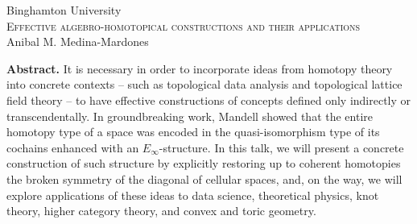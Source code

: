 \documentclass{article}
\begin{document}
	\pagestyle{empty}
	\begin{center}
		\large Binghamton University \\
		\vspace*{5pt}
		\Large\textsc{Effective algebro-homotopical constructions and their applications} \\
		\vspace*{10pt}
		\normalsize Anibal M. Medina-Mardones \\
	\end{center}
	\textbf{Abstract.} It is necessary in order to incorporate ideas from homotopy theory into concrete contexts -- such as topological data analysis and topological lattice field theory -- to have effective constructions of concepts defined only indirectly or transcendentally.
	In groundbreaking work, Mandell showed that the entire homotopy type of a space was encoded in the quasi-isomorphism type of its cochains enhanced with an $E_\infty$-structure.
	In this talk, we will present a concrete construction of such structure by explicitly restoring up to coherent homotopies the broken symmetry of the diagonal of cellular spaces, and, on the way, we will explore applications of these ideas to data science, theoretical physics, knot theory, higher category theory, and convex and toric geometry.


\end{document}
